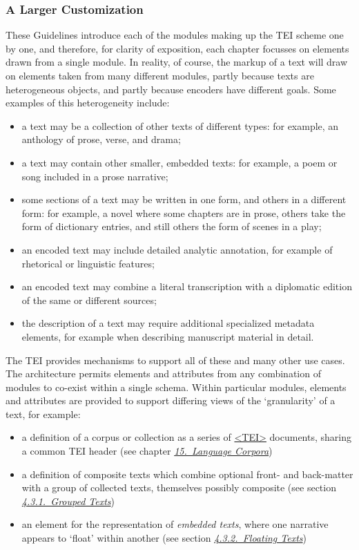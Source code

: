 \subsubsection[{A Larger Customization}]{A Larger Customization}\label{STINlargerExample}\par
These Guidelines introduce each of the modules making up the TEI scheme one by one, and therefore, for clarity of exposition, each chapter focusses on elements drawn from a single module. In reality, of course, the markup of a text will draw on elements taken from many different modules, partly because texts are heterogeneous objects, and partly because encoders have different goals. Some examples of this heterogeneity include: \begin{itemize}
\item a text may be a collection of other texts of different types: for example, an anthology of prose, verse, and drama;
\item a text may contain other smaller, embedded texts: for example, a poem or song included in a prose narrative;
\item some sections of a text may be written in one form, and others in a different form: for example, a novel where some chapters are in prose, others take the form of dictionary entries, and still others the form of scenes in a play; 
\item an encoded text may include detailed analytic annotation, for example of rhetorical or linguistic features; 
\item an encoded text may combine a literal transcription with a diplomatic edition of the same or different sources; 
\item the description of a text may require additional specialized metadata elements, for example when describing manuscript material in detail.
\end{itemize} \par
The TEI provides mechanisms to support all of these and many other use cases. The architecture permits elements and attributes from any combination of modules to co-exist within a single schema. Within particular modules, elements and attributes are provided to support differing views of the ‘granularity’ of a text, for example: \begin{itemize}
\item a definition of a corpus or collection as a series of \hyperref[TEI.TEI]{<TEI>} documents, sharing a common TEI header (see chapter \textit{\hyperref[CC]{15.\ Language Corpora}})
\item a definition of composite texts which combine optional front- and back-matter with a group of collected texts, themselves possibly composite (see section \textit{\hyperref[DSGRP]{4.3.1.\ Grouped Texts}})
\item an element for the representation of \textit{embedded texts}, where one narrative appears to ‘float’ within another (see section \textit{\hyperref[DSFLT]{4.3.2.\ Floating Texts}})
\end{itemize} \par

